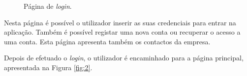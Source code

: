 \begin{figure}[ht!]
\centering
{}
\caption{Página de \textit{login}.}
\label{fig:1}
\end{figure}

Nesta página é possível o utilizador inserir as suas credenciais para entrar na aplicação. Também é possível registar uma nova conta ou recuperar o acesso a uma conta. Esta página apresenta também os contactos da empresa.\par
Depois de efetuado o \textit{login}, o utilizador é encaminhado para a página principal, apresentada na Figura \ref{fig:2}.

